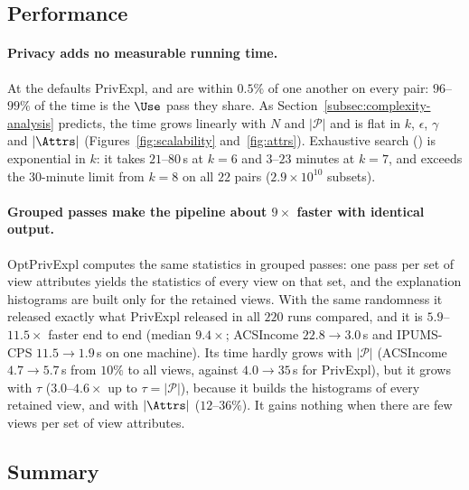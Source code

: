 \subsection{Performance}
\label{subsec:scalability}

\paragraph{Privacy adds no measurable running time.}
At the defaults \textsf{PrivExpl}, \Bone{} and \Bthree{} are within $0.5\%$ of one another on every pair: $96$--$99\%$ of the time is the $\Use$ pass they share.
As Section~\ref{subsec:complexity-analysis} predicts, the time grows linearly with $N$ and $|\mathcal{P}|$ and is flat in $k$, $\epsilon$, $\gamma$ and $|\Attrs|$ (Figures~\ref{fig:scalability} and~\ref{fig:attrs}).
Exhaustive search (\Btwo{}) is exponential in $k$: it takes $21$--$80$\,s at $k=6$ and $3$--$23$ minutes at $k=7$, and exceeds the $30$-minute limit from $k=8$ on all $22$ pairs ($2.9\times10^{10}$ subsets).

\paragraph{Grouped passes make the pipeline about $9\times$ faster with identical output.}
\textsf{OptPrivExpl} computes the same statistics in grouped passes: one pass per set of view attributes yields the statistics of every view on that set, and the explanation histograms are built only for the retained views.
With the same randomness it released exactly what \textsf{PrivExpl} released in all $220$ runs compared, and it is $5.9$--$11.5\times$ faster end to end (median $9.4\times$; ACSIncome $22.8\rightarrow3.0$\,s and IPUMS-CPS $11.5\rightarrow1.9$\,s on one machine).
Its time hardly grows with $|\mathcal{P}|$ (ACSIncome $4.7\rightarrow5.7$\,s from $10\%$ to all views, against $4.0\rightarrow35$\,s for \textsf{PrivExpl}), but it grows with $\tau$ ($3.0$--$4.6\times$ up to $\tau=|\mathcal{P}|$), because it builds the histograms of every retained view, and with $|\Attrs|$ ($12$--$36\%$).
It gains nothing when there are few views per set of view attributes.

\subsection{Summary}
\label{subsec:experiments-summary}

